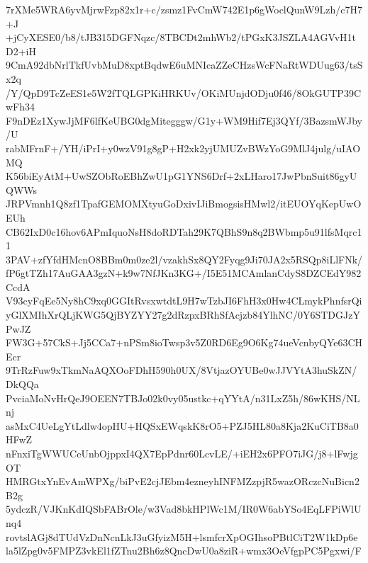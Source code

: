 7rXMe5WRA6yvMjrwFzp82x1r+c/zsmz1FvCmW742E1p6gWoclQunW9Lzh/c7H7+J
+jCyXESE0/b8/tJB315DGFNqzc/8TBCDt2mhWb2/tPGxK3JSZLA4AGVvH1tD2+iH
9CmA92dbNrlTkfUvbMuD8xptBqdwE6uMNIcaZZeCHzsWcFNaRtWDUug63/tsSx2q
/Y/QpD9TcZeES1e5W2fTQLGPKiHRKUv/OKiMUnjdODju0f46/8OkGUTP39CwFh34
F9nDEz1XywJjMF6lfKeUBG0dgMitegggw/G1y+WM9Hif7Ej3QYf/3BazsmWJby/U
rabMFrnF+/YH/iPrI+y0wzV91g8gP+H2xk2yjUMUZvBWzYoG9MlJ4julg/uIAOMQ
K56biEyAtM+UwSZObRoEBhZwU1pG1YNS6Drf+2xLHaro17JwPbnSuit86gyUQWWs
JRPVmnh1Q8zf1TpafGEMOMXtyuGoDxivIJiBmogsisHMwl2/itEUOYqKepUwOEUh
CB62IxD0c16hov6APmIquoNsH8doRDTah29K7QBhS9n8q2BWbmp5u91lfsMqrc11
3PAV+zfYfdHMcnO8BBm0m0ze2l/vzakhSx8QY2Fyqg9Ji70JA2x5RSQp8iLlFNk/
fP6gtTZh17AuGAA3gzN+k9w7NfJKn3KG+/I5E51MCAmlanCdyS8DZCEdY982CcdA
V93cyFqEe5Ny8hC9xq0GGItRvsxwtdtL9H7wTzbJI6FhH3x0Hw4CLmykPhnfsrQi
yGlXMIhXrQLjKWG5QjBYZYY27g2dRzpxBRhSfAcjzb84YlhNC/0Y6STDGJzYPwJZ
FW3G+57CkS+Jj5CCa7+nPSm8ioTwsp3v5Z0RD6Eg9O6Kg74ueVcnbyQYe63CHEcr
9TrRzFuw9xTkmNaAQXOoFDhH590h0UX/8VtjazOYUBe0wJJVYtA3huSkZN/DkQQa
PvciaMoNvHrQeJ9OEEN7TBJo02k0vy05ustkc+qYYtA/n31LxZ5h/86wKHS/NLnj
asMxC4UeLgYtLdlw4opHU+HQSxEWqskK8rO5+PZJ5HL80a8Kja2KuCiTB8a0HFwZ
nFnxiTgWWUCeUnbOjppxI4QX7EpPdnr60LcvLE/+iEH2x6PFO7iJG/j8+lFwjgOT
HMRGtxYnEvAmWPXg/biPvE2cjJEbm4ezneyhINFMZzpjR5wazORczcNuBicn2B2g
5ydczR/VJKnKdIQSbFABrOle/w3Vad8bkHPlWc1M/IR0W6abYSo4EqLFPiWlUnq4
rovtslAGj8dTUdVzDnNcnLkJ3uGfyizM5H+lsmfcrXpOGIhsoPBtlCiT2W1kDp6e
la5lZpg0v5FMPZ3vkEl1fZTnu2Bh6z8QncDwU0a8ziR+wmx3OeVfgpPC5Pgxwi/F
